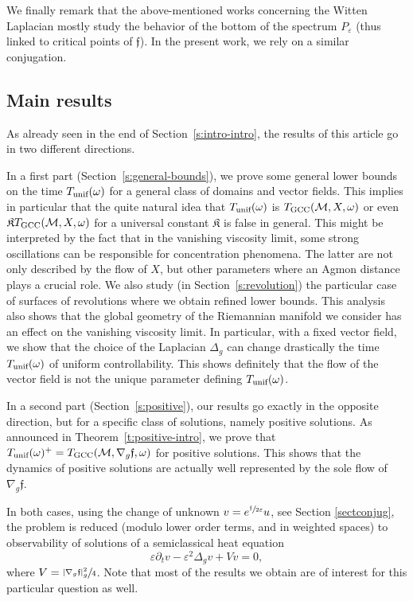 \documentclass[10pt]{amsart}
\newcommand{\GCC}{\textup{GCC}}
\newcommand{\unif}{\textup{unif}}
\theoremstyle{definition}
\newcommand{\M}{\ensuremath{\mathcal M}}
\newcommand{\f}{\ensuremath{\mathfrak{f}}}
\newcommand\Lap{\Delta_{g}}
\newcommand\nablag{\nabla_{g}}
\let\e\varepsilon
\let\eps\varepsilon
\begin{document}
We finally remark that the above-mentioned works concerning the Witten Laplacian mostly study the behavior of the bottom of the spectrum $P_\eps$ (thus linked to critical points of $\f$).
In the present work, we rely on a similar conjugation.

\subsection{Main results}
\label{s:main-res}
As already seen in the end of Section~\ref{s:intro-intro}, the results of this article go in two different directions.

In a first part (Section~\ref{s:general-bounds}), we prove some general lower bounds on the time $T_{\unif}(\omega)$ for a general class of domains and vector fields. This implies in particular that the quite natural idea that $T_{\unif}(\omega)$ is $T_{\GCC}(\M,X,\omega)$ or even $\mathfrak{K}T_{\GCC}(\M,X,\omega)$ for a universal constant $\mathfrak{K}$ is false in general. This might be interpreted by the fact that in the vanishing viscosity limit, some strong oscillations can be responsible for concentration phenomena. The latter are not only described by the flow of $X$, but other parameters where an Agmon distance plays a crucial role. We also study (in Section~\ref{s:revolution}) the particular case of surfaces of revolutions where we obtain refined lower bounds. This analysis also shows that the global geometry of the Riemannian manifold we consider has an effect on the vanishing viscosity limit. In particular, with a fixed vector field, we show that the choice of the Laplacian $\Lap$ can change drastically the time $T_{\unif}(\omega)$ of uniform controllability. This shows definitely that the flow of the vector field is not the unique parameter defining $T_{\unif}(\omega)$.

In a second part (Section~\ref{s:positive}), our results go exactly in the opposite direction, but for a specific class of solutions, namely positive solutions. As announced in Theorem~\ref{t:positive-intro}, we prove that $T_{\unif}(\omega)^+=T_{\GCC}(\M,\nabla_g\f,\omega)$ for positive solutions.
This shows that the dynamics of positive solutions are actually well represented by the sole flow of~$\nabla_g\f$.

In both cases, using the change of unknown $v= e^{\sfrac{\f}{2\eps}} u$, see Section \ref{sectconjug}, the problem is reduced (modulo lower order terms, and in weighted spaces) to observability of solutions of a semiclassical heat equation
\[
\e\partial_t v- \eps^2 \Lap v+Vv =0,
\]
where $V= \sfrac{|\nablag \f|_g^2}{4}$. Note that most of the results we obtain are of interest for this particular question as well.
\end{document}
